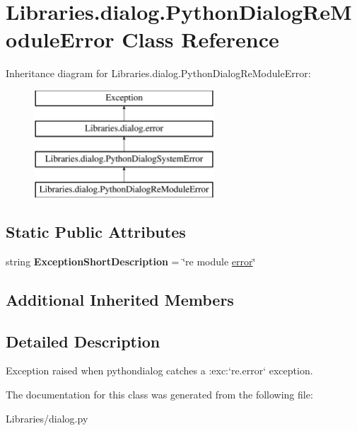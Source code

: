 \hypertarget{class_libraries_1_1dialog_1_1_python_dialog_re_module_error}{}\section{Libraries.\+dialog.\+Python\+Dialog\+Re\+Module\+Error Class Reference}
\label{class_libraries_1_1dialog_1_1_python_dialog_re_module_error}
Inheritance diagram for Libraries.\+dialog.\+Python\+Dialog\+Re\+Module\+Error\+:\begin{figure}[H]
\begin{center}
\leavevmode
\includegraphics[height=4.000000cm]{class_libraries_1_1dialog_1_1_python_dialog_re_module_error}
\end{center}
\end{figure}
\subsection*{Static Public Attributes}
\begin{DoxyCompactItemize}
\item 
string {\bfseries Exception\+Short\+Description} = \char`\"{}\textquotesingle{}re\textquotesingle{} module \hyperlink{class_libraries_1_1dialog_1_1error}{error}\char`\"{}\hypertarget{class_libraries_1_1dialog_1_1_python_dialog_re_module_error_acea472bc728628be3507e9a3554c01dc}{}\label{class_libraries_1_1dialog_1_1_python_dialog_re_module_error_acea472bc728628be3507e9a3554c01dc}

\end{DoxyCompactItemize}
\subsection*{Additional Inherited Members}


\subsection{Detailed Description}
\begin{DoxyVerb}Exception raised when pythondialog catches a :exc:`re.error` exception.\end{DoxyVerb}
 

The documentation for this class was generated from the following file\+:\begin{DoxyCompactItemize}
\item 
Libraries/dialog.\+py\end{DoxyCompactItemize}
